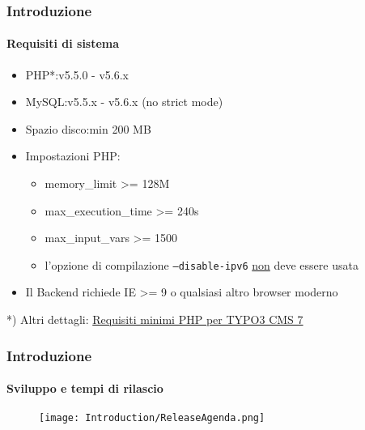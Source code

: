 \begin{frame}[fragile]
	\frametitle{Introduzione}
	\framesubtitle{Requisiti di sistema}

	\begin{itemize}
		\item PHP*:\tabto{2.2cm}v5.5.0 - v5.6.x
		\item MySQL:\tabto{2.2cm}v5.5.x - v5.6.x (no strict mode)
		\item Spazio disco:\tabto{2.2cm}min 200 MB
		\item Impostazioni PHP:

			\begin{itemize}
				\item memory\_limit >= 128M
				\item max\_execution\_time >= 240s
				\item max\_input\_vars >= 1500
				\item l'opzione di compilazione \texttt{--disable-ipv6} \underline{non} deve essere usata
			\end{itemize}

		\item Il Backend richiede IE >= 9 o qualsiasi altro browser moderno

	\end{itemize}

	\vspace{1cm}

	*) Altri dettagli: \href{http://typo3.org/news/article/php-minimum-requirements-for-typo3-cms-7/}{Requisiti minimi PHP per TYPO3 CMS 7}

\end{frame}

\begin{frame}[fragile]
	\frametitle{Introduzione}
	\framesubtitle{Sviluppo e tempi di rilascio}

	\begin{figure}
		\texttt{[image: Introduction/ReleaseAgenda.png]}
	\end{figure}

\end{frame}

